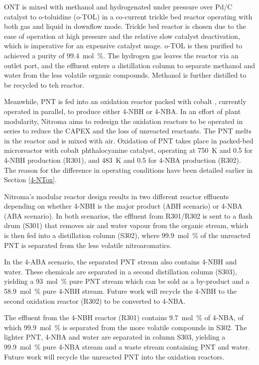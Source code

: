 ONT is mixed with methanol and hydrogenated under pressure over Pd/C catalyst to o-toluidine (o-TOL) in a co-current trickle bed reactor operating with both gas and liquid in downflow mode. Trickle bed reactor is chosen due to the ease of operation at high pressure and the relative slow catalyst deactivation, which is imperative for an expensive catalyst usage. o-TOL is then purified to achieved a purity of \SI{99.4}{mol\percent}. The hydrogen gas leaves the reactor via an outlet port, and the effluent enters a distillation column to separate methanol and water from the less volatile organic compounds. Methanol is further distilled to be recycled to teh reactor.

Meanwhile, PNT is fed into an oxidation reactor packed with cobalt , currently operated in parallel, to produce either 4-NBH or 4-NBA. In an effort of plant modularity, Nitroma aims to redesign the oxidation reactors to be operated in series to reduce the CAPEX and the loss of unreacted reactants. The PNT melts in the reactor and is mixed with air. Oxidation of PNT takes place in packed-bed microreactor with cobalt phthalocyanine catalyst, operating at \SI{750}{\K} and \SI{0.5}{\atm} for 4-NBH production (R301), and \SI{483}{\K} and \SI{0.5}{\atm} for 4-NBA production (R302). The reason for the difference in operating conditions have been detailed earlier in Section \ref{4-NTox}.

Nitroma's modular reactor design results in two different reactor effluents depending on whether 4-NBH is the major product (ABH scenario) or 4-NBA (ABA scenario). In both scenarios, the effluent from R301/R302 is sent to a flash drum (S301) that removes air and water vapour from the organic stream, which is then fed into a distillation column (S302), where \SI{99.9}{mol\percent} of the unreacted PNT is separated from the less volatile nitroaromatics. 

In the 4-ABA scenario, the separated PNT stream also contains 4-NBH and water. These chemicals are separated in a second distillation column (S303), yielding a \SI{93}{mol\percent} pure PNT stream which can be sold as a by-product and a \SI{58.9}{mol\percent} pure 4-NBH stream. Future work will recycle the 4-NBH to the second oxidation reactor (R302) to be converted to 4-NBA.

The effluent from the 4-NBH reactor (R301) contains \SI{9.7}{mol\percent} of 4-NBA, of which \SI{99.9}{mol\percent} is separated from the more volatile compounds in S302. The lighter PNT, 4-NBA and water are separated in column S303, yielding a \SI{99.9}{mol\percent} pure 4-NBA stream and a waste stream containing PNT and water. Future work will recycle the unreacted PNT into the oxidation reactors.



 

